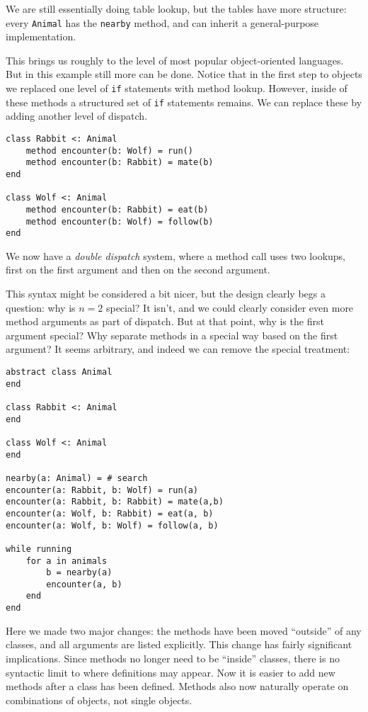 We are still essentially doing table lookup, but the tables have
more structure: every \texttt{Animal} has the \texttt{nearby}
method, and can inherit a general-purpose implementation.

This brings us roughly to the level of most popular object-oriented
languages. But in this example still more can be done. Notice that
in the first step to objects we replaced one level of \texttt{if}
statements with method lookup. However, inside of these methods
a structured set of \texttt{if} statements remains. We can
replace these by adding another level of dispatch.

\begin{singlespace}
\begin{verbatim}
class Rabbit <: Animal
    method encounter(b: Wolf) = run()
    method encounter(b: Rabbit) = mate(b)
end

class Wolf <: Animal
    method encounter(b: Rabbit) = eat(b)
    method encounter(b: Wolf) = follow(b)
end
\end{verbatim}
\end{singlespace}

We now have a \emph{double dispatch} system, where a method call
uses two lookups, first on the first argument and then on the
second argument.

This syntax might be considered a bit nicer, but the design
clearly begs a question: why is $n=2$ special? It isn't, and we
could clearly consider even more method arguments as part of
dispatch. But at that point, why is the first argument special?
Why separate methods in a special way based on the first argument?
It seems arbitrary, and indeed we can remove the special treatment:

\begin{singlespace}
\begin{verbatim}
abstract class Animal
end

class Rabbit <: Animal
end

class Wolf <: Animal
end

nearby(a: Animal) = # search
encounter(a: Rabbit, b: Wolf) = run(a)
encounter(a: Rabbit, b: Rabbit) = mate(a,b)
encounter(a: Wolf, b: Rabbit) = eat(a, b)
encounter(a: Wolf, b: Wolf) = follow(a, b)

while running
    for a in animals
        b = nearby(a)
        encounter(a, b)
    end
end
\end{verbatim}
\end{singlespace}

Here we made two major changes: the methods have been moved ``outside''
of any classes, and all arguments are listed explicitly. This change
has fairly significant implications. Since methods no longer need to be
``inside'' classes, there is no syntactic limit to where definitions
may appear. Now it is easier to add new methods after a class has
been defined. Methods also now naturally operate on combinations of
objects, not single objects.

